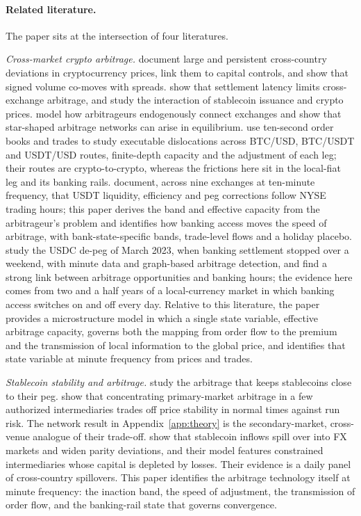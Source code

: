 \documentclass[12pt]{article}
\theoremstyle{definition}
\theoremstyle{remark}
\begin{document}
\paragraph{Related literature.}
The paper sits at the intersection of four literatures.

\emph{Cross-market crypto arbitrage.} \citet{makarov2020trading} document large and persistent cross-country deviations in cryptocurrency prices, link them to capital controls, and show that signed volume co-moves with spreads. \citet{hautsch2024building} show that settlement latency limits cross-exchange arbitrage, and \citet{griffin2020untethered} study the interaction of stablecoin issuance and crypto prices. \citet{hu2023competition} model how arbitrageurs endogenously connect exchanges and show that star-shaped arbitrage networks can arise in equilibrium. \citet{shao2026microstructure} use ten-second order books and trades to study executable dislocations across BTC/USD, BTC/USDT and USDT/USD routes, finite-depth capacity and the adjustment of each leg; their routes are crypto-to-crypto, whereas the frictions here sit in the local-fiat leg and its banking rails. \citet{baulkaran2026market} document, across nine exchanges at ten-minute frequency, that USDT liquidity, efficiency and peg corrections follow NYSE trading hours; this paper derives the band and effective capacity from the arbitrageur's problem and identifies how banking access moves the speed of arbitrage, with bank-state-specific bands, trade-level flows and a holiday placebo. \citet{li2026settlement} study the USDC de-peg of March 2023, when banking settlement stopped over a weekend, with minute data and graph-based arbitrage detection, and find a strong link between arbitrage opportunities and banking hours; the evidence here comes from two and a half years of a local-currency market in which banking access switches on and off every day. Relative to this literature, the paper provides a microstructure model in which a single state variable, effective arbitrage capacity, governs both the mapping from order flow to the premium and the transmission of local information to the global price, and identifies that state variable at minute frequency from prices and trades.

\emph{Stablecoin stability and arbitrage.} \citet{lyons2023stablecoins} study the arbitrage that keeps stablecoins close to their peg. \citet{ma2025stablecoin} show that concentrating primary-market arbitrage in a few authorized intermediaries trades off price stability in normal times against run risk. The network result in Appendix~\ref{app:theory} is the secondary-market, cross-venue analogue of their trade-off. \citet{aldasoro2026stablecoin} show that stablecoin inflows spill over into FX markets and widen parity deviations, and their model features constrained intermediaries whose capital is depleted by losses. Their evidence is a daily panel of cross-country spillovers. This paper identifies the arbitrage technology itself at minute frequency: the inaction band, the speed of adjustment, the transmission of order flow, and the banking-rail state that governs convergence.
\end{document}
